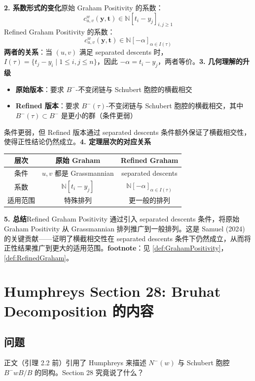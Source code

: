 \textbf{2. 系数形式的变化}原始 Graham Positivity 的系数：$$c^w_{u,v}(\mathbf{y}, \mathbf{t}) \in \mathbb{N}[t_i - y_j]_{i,j \geq 1}$$Refined Graham Positivity 的系数：$$c^w_{u,v}(\mathbf{y}, \mathbf{t}) \in \mathbb{N}[-\alpha]_{\alpha \in I(\tau)}$$\textbf{两者的关系}：当 $(u,v)$ 满足 separated descents 时，$I(\tau) = \{t_j - y_i \mid 1 \leq i,j \leq n\}$，因此 $-\alpha = t_i - y_j$，两者等价。\textbf{3. 几何理解的升级}
\begin{itemize}
\item \textbf{原始版本}：要求 $B^-$-不变闭链与 Schubert 胞腔的横截相交\item \textbf{Refined 版本}：要求 $B^-(\tau)$-不变闭链与 Schubert 胞腔的横截相交，其中 $B^-(\tau) \subset B^-$ 是更小的群（条件更弱）
\end{itemize}条件更弱，但 Refined 版本通过 separated descents 条件额外保证了横截相交性，使得正性结论仍然成立。\textbf{4. 定理层次的对应关系}
\begin{center}
\begin{tabular}{c|c|c}层次 & 原始 Graham & Refined Graham \\ \hline 条件 & $u, v$ 都是 Grassmannian & separated descents \\ 系数 & $\mathbb{N}[t_i - y_j]$ & $\mathbb{N}[-\alpha]_{\alpha \in I(\tau)}$ \\适用范围 & 特殊排列 & 更一般的排列
\end{tabular}
\end{center}\textbf{5. 总结}Refined Graham Positivity 通过引入 separated descents 条件，将原始 Graham Positivity 从 Grassmannian 排列推广到一般排列。这是 Samuel (2024) 的关键贡献——证明了横截相交性在 separated descents 条件下仍然成立，从而将正性结果推广到更大的适用范围。\textbf{footnote}：见 \cref{def:GrahamPositivity}，\cref{def:RefinedGraham}。
\section{Humphreys Section 28: Bruhat Decomposition 的内容}\label{sec:HumphreysSection28}
\subsection{问题}
正文（引理 2.2 前）引用了 Humphreys \cite[Section 28]{humphreys1975} 来描述 $N^-(w)$ 与 Schubert 胞腔 $B^-wB/B$ 的同构。Section 28 究竟说了什么？
